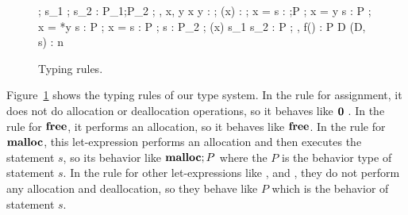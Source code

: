 \begin{figure}[tp]
\begin{minipage}{\textwidth}


{\Theta ; \Gamma \vdash s_{1} ; s_{2} : P_{1};P_{2} }
\infax[T-Assign]
{\Theta ; \Gamma, x, y \vdash *x \leftarrow y :  }
{\Theta ; \Gamma \vdash \Free(x) : \Free}
{\Theta ; \Gamma \vdash \LET x = \MALLOC \; \IN s  : \Malloc;P}
{\Theta ; \Gamma \vdash \LET x = y \; \IN s : P}
{\Theta ; \Gamma \vdash \LET x = *y \; \IN s : P}
{\Theta ; \Gamma \vdash \LET x =  \; \IN s : P}
{\Theta ; \Gamma \vdash s : P_{2}}
{\Theta ; \Gamma \vdash \IFNULL(x) \; \THEN s_{1}\; \ELSE s_{2} : P}
{\Theta; \Gamma,  \vdash f() : P}
{\vdash D \COL \Theta}
{\vdash (D, s) : n}

\end{minipage}
\caption{Typing rules.}
\label{fig:typingrules}
\end{figure}

Figure~\ref{fig:typingrules} shows the typing rules of our type
system. In the rule for assignment, it does not do allocation or
deallocation operations, so it behaves like \(\bf 0\) . In the rule
for \(\mathbf{free}\), it performs an allocation, so it behaves like
\(\mathbf{free}\).  In the rule for \(\mathbf{malloc}\), this let-expression performs
an allocation and then executes the statement \(s\), so its behavior
like \(\mathbf{malloc};P\) where the \(P\) is the behavior type of statement
\(s\). In the rule for other let-expressions like ,
 and , they do not perform any
allocation and deallocation, so they behave like \(P\) which is the
behavior of statement \(s\).


